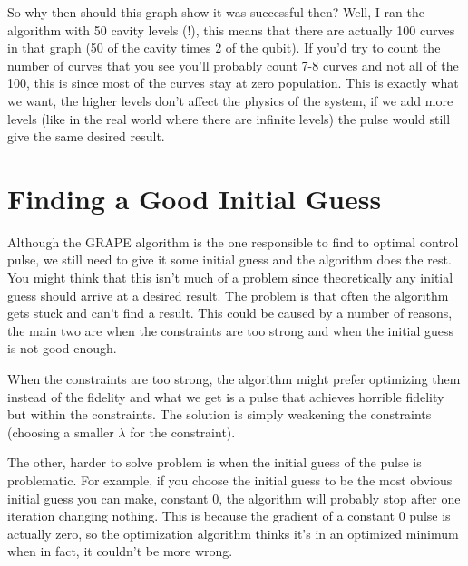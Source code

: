 So why then should this graph show it was successful then? Well, I ran the algorithm with 50 cavity levels (!), this means that there are actually 100 curves in that graph (50 of the cavity times 2 of the qubit). If you'd try to count the number of curves that you see you'll probably count 7-8 curves and not all of the 100, this is since most of the curves stay at zero population. This is exactly what we want, the higher levels don't affect the physics of the system, if we add more levels (like in the real world where there are infinite levels) the pulse would still give the same desired result.


\section{Finding a Good Initial Guess}
Although the GRAPE algorithm is the one responsible to find to optimal control pulse, we still need to give it some initial guess and the algorithm does the rest. You might think that this isn't much of a problem since theoretically any initial guess should arrive at a desired result. The problem is that often the algorithm gets stuck and can't find a result. This could be caused by a number of reasons, the main two are when the constraints are too strong and when the initial guess is not good enough.

When the constraints are too strong, the algorithm might prefer optimizing them instead of the fidelity and what we get is a pulse that achieves horrible fidelity but within the constraints. The solution is simply weakening the constraints (choosing a smaller $\lambda$ for the constraint).

The other, harder to solve problem is when the initial guess of the pulse is problematic. For example, if you choose the initial guess to be the most obvious initial guess you can make, constant 0, the algorithm will probably stop after one iteration changing nothing. This is because the gradient of a constant 0 pulse is actually zero, so the optimization algorithm thinks it's in an optimized minimum when in fact, it couldn't be more wrong.

